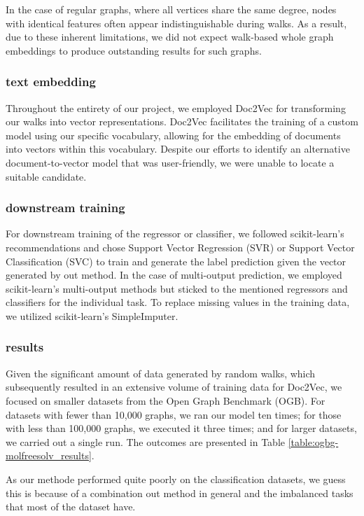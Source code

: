 In the case of regular graphs, where all vertices share the same degree, nodes with identical features often appear indistinguishable during walks. As a result, due to these inherent limitations, we did not expect walk-based whole graph embeddings to produce outstanding results for such graphs.

\subsubsection{text embedding}
Throughout the entirety of our project, we employed Doc2Vec\cite{2014doc2vec} for transforming our walks into vector representations. Doc2Vec facilitates the training of a custom model using our specific vocabulary, allowing for the embedding of documents into vectors within this vocabulary. Despite our efforts to identify an alternative document-to-vector model that was user-friendly, we were unable to locate a suitable candidate.




\subsubsection{downstream training}
For downstream training of the regressor or classifier, we followed scikit-learn's recommendations and chose Support Vector Regression (SVR) or Support Vector Classification (SVC) to train and generate the label prediction given the vector generated by out method. In the case of multi-output prediction, we employed scikit-learn's multi-output methods but sticked to the mentioned regressors and classifiers for the individual task. To replace missing values in the training data, we utilized scikit-learn's SimpleImputer.

\subsubsection{results}
Given the significant amount of data generated by random walks, which subsequently resulted in an extensive volume of training data for Doc2Vec, we focused on smaller datasets from the Open Graph Benchmark (OGB). For datasets with fewer than 10,000 graphs, we ran our model ten times; for those with less than 100,000 graphs, we executed it three times; and for larger datasets, we carried out a single run. The outcomes are presented in Table \ref{table:ogbg-molfreesolv_results}.

As our methode performed quite poorly on the classification datasets, we guess this is because of a combination out method in general and the imbalanced tasks that most of the dataset have.

